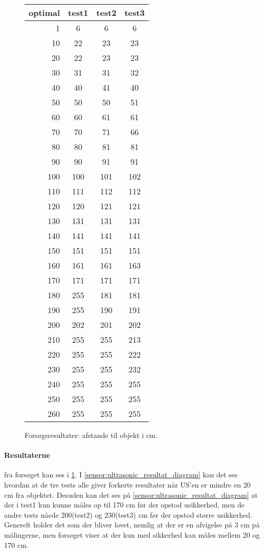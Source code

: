\begin{figure}[h]
\centering
\begin{tabular}{r | c | c | c |}
optimal & test1 & test2 & test3 \\
\hline
1 & 6 & 6 & 6 \\
10&	22&	23&	23\\
20&	22&	23&	23\\
30&	31&	31&	32\\
40&	40&	41&	40\\
50&	50&	50&	51\\
60&	60&	61&	61\\
70&	70&	71&	66\\
80&	80&	81&	81\\
90&	90&	91&	91\\
100&	100&	101&	102\\
110&	111&	112&	112\\
120&	120&	121&	121\\
130&	131&	131&	131\\
140&	141&	141&	141\\
150&	151&	151&	151\\
160&	161&	161&	163\\
170&	171&	171&	171\\
180&	255&	181&	181\\
190&	255&	190&	191\\
200&	202&	201&	202\\
210&	255&	255&	213\\
220&	255&	255&	222\\
230&	255&	255&	232\\
240&	255&	255&	255\\
250&	255&	255&	255\\
260&	255&	255&	255\\
\end{tabular}
\caption{Forsøgsresultater: afstande til objekt i cm.}
\label{sensor:ultrasonic_test_data}
\end{figure}

\paragraph{Resultaterne} fra forsøget kan ses i \cref{sensor:ultrasonic_test_data}.
I \cref{sensor:ultrasonic_resultat_diagram} kan det ses hvordan at de tre tests alle giver forkerte resultater når US'en er mindre en 20 cm fra objektet.
Desuden kan det ses på \cref{sensor:ultrasonic_resultat_diagram} at der i test1 kun kunne måles op til 170 cm før der opstod usikkerhed, men de andre tests nåede 200(test2) og 230(test3) cm før der opstod større usikkerhed.
Generelt holder det som der bliver lovet, nemlig at der er en afvigelse på 3 cm på målingerne, men forsøget viser at der kun med sikkerhed kan måles mellem 20 og 170 cm.

